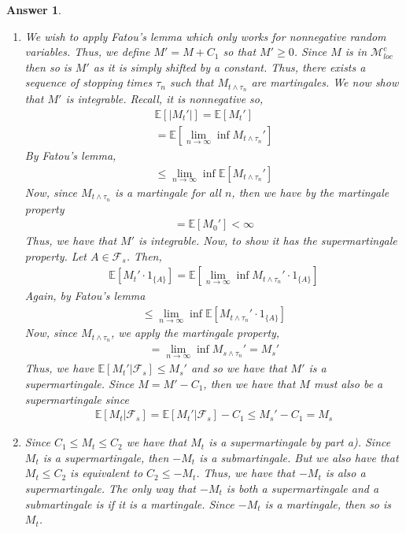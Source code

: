 \documentclass[12pt]{article}
\theoremstyle{colon}
\newtheorem*{answer}{Answer}
\begin{document}
\begin{answer}
  \leavevmode
  \begin{enumerate}[label=\alph*)]
      \item We wish to apply Fatou's lemma which only works for nonnegative random variables. Thus, we define $M' = M + C_1$ so that $M' \geq 0$. Since $M$ is in $\mathcal{M}_{loc}^c$ then so is $M'$ as it is simply shifted by a constant. Thus, there exists a sequence of stopping times $\tau_n$ such that $M_{t \land \tau_n}$ are martingales. We now show that $M'$ is integrable. Recall, it is nonnegative so,
      \begin{gather*}
        \mathbb{E}[\lvert M_t' \rvert] = \mathbb{E}[ M_t' ] \\
        = \mathbb{E}[ \lim_{n \rightarrow \infty} \inf M_{t \land \tau_n}' ]
      \end{gather*}
      By Fatou's lemma,
      \begin{gather*}
        \leq \lim_{n \rightarrow \infty} \inf \mathbb{E}[ M_{t \land \tau_n}' ]
      \end{gather*}
      Now, since $M_{t \land \tau_n}$ is a martingale for all $n$, then we have by the martingale property
      \begin{gather*}
        = \mathbb{E}[ M_0' ] < \infty
      \end{gather*}
      Thus, we have that $M'$ is integrable. Now, to show it has the supermartingale property. Let $A \in \mathcal{F}_s$. Then,
      \begin{gather*}
        \mathbb{E}[ M_t' \cdot 1_{\{A\}} ] = \mathbb{E}[ \lim_{n \rightarrow \infty} \inf M_{t \land \tau_n}' \cdot 1_{\{A\}} ]
      \end{gather*}
      Again, by Fatou's lemma
      \begin{gather*}
        \leq \lim_{n \rightarrow \infty} \inf \mathbb{E}[ M_{t \land \tau_n}' \cdot 1_{\{A\}} ]
      \end{gather*}
      Now, since $M_{t \land \tau_n}$, we apply the martingale property,
      \begin{gather*}
        = \lim_{n \rightarrow \infty} \inf M_{s \land \tau_n}' = M_s'
      \end{gather*}
      Thus, we have $\mathbb{E}[ M_t' | \mathcal{F}_s ] \leq M_s'$ and so we have that $M'$ is a supermartingale. Since $M = M' - C_1$, then we have that $M$ must also be a supermartingale since
      \begin{gather*}
        \mathbb{E}[ M_t | \mathcal{F}_s ] = \mathbb{E}[ M_t' | \mathcal{F}_s ] - C_1 \leq M_s' - C_1 = M_s
      \end{gather*}

    \item Since $C_1 \leq M_t \leq C_2$ we have that $M_t$ is a supermartingale by part a). Since $M_t$ is a supermartingale, then $-M_t$ is a submartingale. But we also have that $M_t \leq C_2$ is equivalent to $C_2 \leq -M_t$. Thus, we have that $-M_t$ is also a supermartingale. The only way that $-M_t$ is both a supermartingale and a submartingale is if it is a martingale. Since $-M_t$ is a martingale, then so is $M_t$.
  \end{enumerate}
\end{answer}
\end{document}
